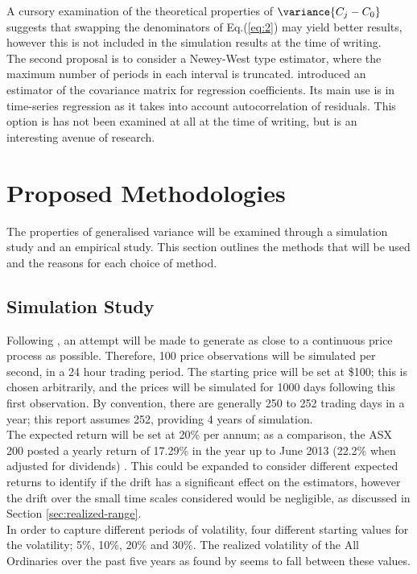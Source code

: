 \documentclass[12pt]{article}
\begin{document}
A cursory examination of the theoretical properties of $\variance{C_j - C_0}$ suggests that swapping the
denominators of Eq.(\ref{eq:2}) may yield better results, however this is not included in the simulation
results at the time of writing. \\

The second proposal is to consider a Newey-West type estimator, where the maximum number of periods in each
interval is truncated. \citet{Newey1987} introduced an estimator of the covariance matrix for regression
coefficients. Its main use is in time-series regression as it takes into account autocorrelation of
residuals. This option is has not been examined at all at the time of writing, but is an interesting avenue of
research. 

\section{Proposed Methodologies}

The properties of generalised variance will be examined through a simulation study and an empirical
study. This section outlines the methods that will be used and the reasons for each choice of method.

\subsection{Simulation Study}
Following \citet{Martens2007}, an attempt will be made to generate as close to a continuous price process as
possible. Therefore, 100 price observations will be simulated per second, in a 24 hour trading period. The
starting price will be set at \$100; this is chosen arbitrarily, and the prices will be simulated for 1000
days following this first observation. By convention, there are generally 250 to 252 trading days in a year;
this report assumes 252, providing 4 years of simulation. \\

The expected return will be set at 20\% per annum; as a comparison, the ASX 200 posted a yearly return of
17.29\% in the year up to June 2013 (22.2\% when adjusted for dividends) \citep{Yeow2013}. This could be
expanded to consider different expected returns to identify if the drift has a significant effect on the
estimators, however the drift over the small time scales considered would be negligible, as discussed in
Section \ref{sec:realized-range}. \\

In order to capture different periods of volatility, four different starting values for the volatility; 5\%,
10\%, 20\% and 30\%. The realized volatility of the All Ordinaries over the past five years as found by 
\citet{Herber2014} seems to fall between these values. \\
\end{document}
